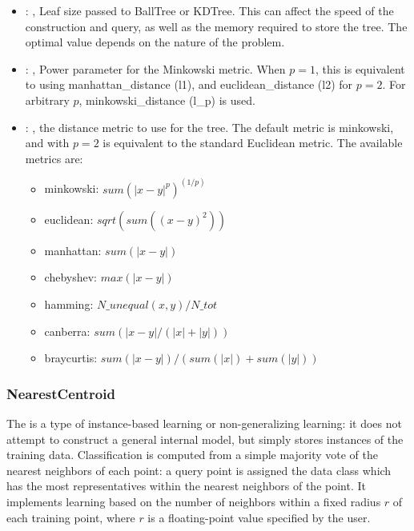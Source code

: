 \begin{itemize}
    \item {}: , 
      Leaf size passed to BallTree or KDTree. This can affect the speed of the construction
      and query, as well as the memory required to store the tree. The optimal value depends on the
      nature of the problem.

    \item {}: , 
      Power parameter for the Minkowski metric. When $p = 1$, this is equivalent to using
      manhattan\_distance (l1), and euclidean\_distance (l2) for $p = 2$. For arbitrary $p$,
      minkowski\_distance                                                  (l\_p) is used.

    \item {}: , 
      the distance metric to use for the tree. The default metric is minkowski, and with
      $p=2$ is equivalent to the standard Euclidean metric.
      The available metrics are:                                                  \begin{itemize}
      \item minkowski: $sum(|x - y|^p)^(1/p)$
      \item euclidean: $sqrt(sum((x - y)^2))$
      \item manhattan: $sum(|x - y|)$                                                    \item
      chebyshev: $max(|x - y|)$                                                    \item hamming:
      $N\_unequal(x, y) / N\_tot$                                                    \item canberra:
      $sum(|x - y| / (|x| + |y|))$                                                    \item
      braycurtis: $sum(|x - y|) / (sum(|x|) + sum(|y|))$
      \end{itemize}
  \end{itemize}


\subsubsection{NearestCentroid}
  The  is a type of instance-based learning or
  non-generalizing learning: it does not attempt to construct a general internal
  model, but simply stores instances of the training data.                          Classification
  is computed from a simple majority vote of the nearest neighbors                          of each
  point: a query point is assigned the data class which has the most
  representatives within the nearest neighbors of the point.                          It implements
  learning based on the number of neighbors within a fixed radius                          $r$ of
  each training point, where $r$ is a floating-point value specified by the
  user.                          

